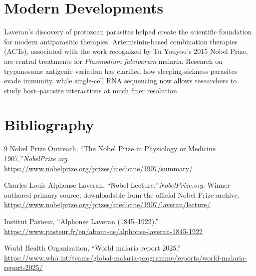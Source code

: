 \section{Modern Developments}

Laveran's discovery of protozoan parasites helped create the scientific foundation for modern antiparasitic therapies. Artemisinin-based combination therapies (ACTs), associated with the work recognized by Tu Youyou's 2015 Nobel Prize, are central treatments for \emph{Plasmodium falciparum} malaria. Research on trypanosome antigenic variation has clarified how sleeping-sickness parasites evade immunity, while single-cell RNA sequencing now allows researchers to study host--parasite interactions at much finer resolution.


\section{Bibliography}

\begin{thebibliography}{9}
Nobel Prize Outreach, ``The Nobel Prize in Physiology or Medicine 1907,''\emph{NobelPrize.org}.\\
\url{https://www.nobelprize.org/prizes/medicine/1907/summary/}

Charles Louis Alphonse Laveran, ``Nobel Lecture,''\emph{NobelPrize.org}. Winner-authored primary source; downloadable from the official Nobel Prize archive.\\
\url{https://www.nobelprize.org/prizes/medicine/1907/laveran/lecture/}

Institut Pasteur, ``Alphonse Laveran (1845--1922).''\\
\url{https://www.pasteur.fr/en/about-us/alphonse-laveran-1845-1922}

World Health Organization, ``World malaria report 2025.''\\
\url{https://www.who.int/teams/global-malaria-programme/reports/world-malaria-report-2025/}
\end{thebibliography}
